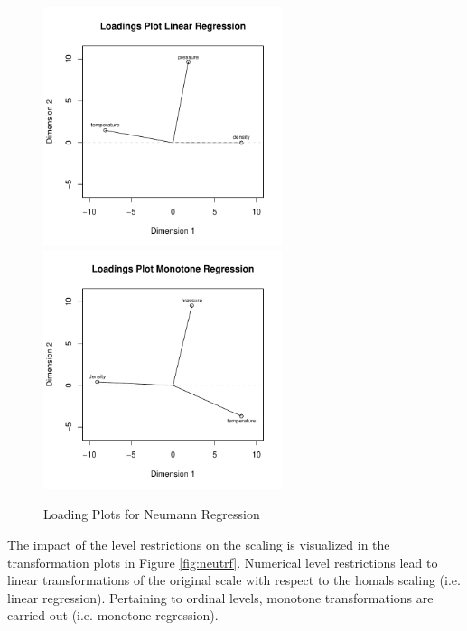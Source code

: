 \documentclass[article, nojss]{jss}
\begin{document}
\begin{figure}[hbt]
\begin{center}
\includegraphics[height=70mm, width=70mm]{neuloadlin.pdf}
\includegraphics[height=70mm, width=70mm]{neuloadmon.pdf}
\caption{\label{fig:neuload}Loading Plots for Neumann Regression}
\end{center}
\end{figure}

The impact of the level restrictions on the scaling is visualized in the transformation plots in Figure \ref{fig:neutrf}. Numerical level restrictions lead to linear transformations of the original scale with respect to the homals scaling (i.e. linear regression). Pertaining to ordinal levels, monotone transformations are carried out (i.e. monotone regression). 
\end{document}
